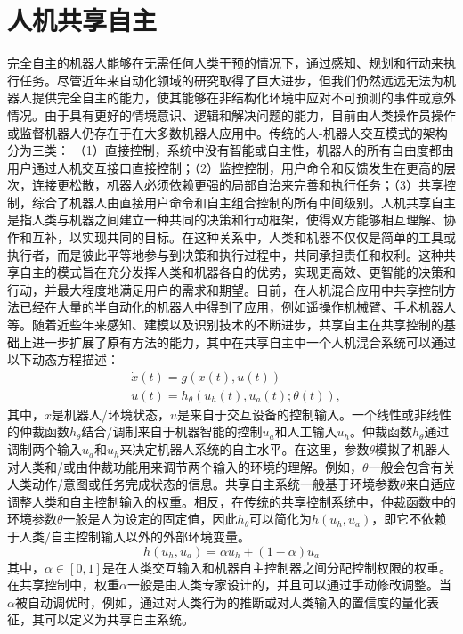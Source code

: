 \section{人机共享自主}
完全自主的机器人能够在无需任何人类干预的情况下，通过感知、规划和行动来执行任务。尽管近年来自动化领域的研究取得了巨大进步，但我们仍然远远无法为机器人提供完全自主的能力，使其能够在非结构化环境中应对不可预测的事件或意外情况。由于具有更好的情境意识、逻辑和解决问题的能力，目前由人类操作员操作或监督机器人仍存在于在大多数机器人应用中。传统的人-机器人交互模式的架构分为三类： （1）直接控制，系统中没有智能或自主性，机器人的所有自由度都由用户通过人机交互接口直接控制；（2）监控控制，用户命令和反馈发生在更高的层次，连接更松散，机器人必须依赖更强的局部自治来完善和执行任务；（3）共享控制，综合了机器人由直接用户命令和自主组合控制的所有中间级别。人机共享自主是指人类与机器之间建立一种共同的决策和行动框架，使得双方能够相互理解、协作和互补，以实现共同的目标。在这种关系中，人类和机器不仅仅是简单的工具或执行者，而是彼此平等地参与到决策和执行过程中，共同承担责任和权利。这种共享自主的模式旨在充分发挥人类和机器各自的优势，实现更高效、更智能的决策和行动，并最大程度地满足用户的需求和期望\cite{selvaggioAutonomyPhysicalHumanRobot2021a}。目前，在人机混合应用中共享控制方法已经在大量的半自动化的机器人中得到了应用，例如遥操作机械臂、手术机器人等。随着近些年来感知、建模以及识别技术的不断进步，共享自主在共享控制的基础上进一步扩展了原有方法的能力，其中在共享自主中一个人机混合系统可以通过以下动态方程描述：
\begin{equation}
    \begin{aligned}
    & \dot{x}(t)=g(x(t), u(t)) \\
    & u(t)=h_\theta\left(u_h(t), u_a(t) ; \theta(t)\right),
    \end{aligned}
    \label{eq:2-1}
\end{equation}
其中，$x$是机器人/环境状态，$u$是来自于交互设备的控制输入。一个线性或非线性的仲裁函数$h_θ$结合/调制来自于机器智能的控制$u_a$和人工输入$u_h$。仲裁函数$h_θ$通过调制两个输入$u_a$和$u_h$来决定机器人系统的自主水平。在这里，参数$θ$模拟了机器人对人类和/或由仲裁功能用来调节两个输入的环境的理解。例如，$θ$一般会包含有关人类动作/意图或任务完成状态的信息。共享自主系统一般基于环境参数$θ$来自适应调整人类和自主控制输入的权重。相反，在传统的共享控制系统中，仲裁函数中的环境参数$θ$一般是人为设定的固定值，因此$h_θ$可以简化为$h(u_h,u_a)$，即它不依赖于人类/自主控制输入以外的外部环境变量。
\begin{equation}
    h\left(u_h, u_a\right)=\alpha u_h+(1-\alpha) u_a
    \label{eq:2-2}
\end{equation}
其中，$α∈[0,1]$是在人类交互输入和机器自主控制器之间分配控制权限的权重。在共享控制中，权重$α$一般是由人类专家设计的，并且可以通过手动修改调整。当$α$被自动调优时，例如，通过对人类行为的推断或对人类输入的置信度的量化表征，其可以定义为共享自主系统。

